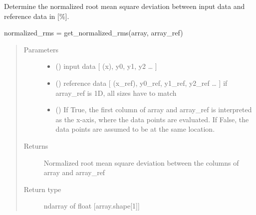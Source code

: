 \documentclass[letterpaper,10pt,english,openany,oneside]{sphinxmanual}
\begin{document}

\begin{fulllineitems}
\label{\detokenize{pygpc:pygpc.misc.get_normalized_rms_deviation}}
Determine the normalized root mean square deviation between input data and reference data in {[}\%{]}.

normalized\_rms = get\_normalized\_rms(array, array\_ref)
\begin{quote}\begin{description}
\item[{Parameters}] \leavevmode\begin{itemize}
\item {} 
 () \textendash{} input data {[} (x), y0, y1, y2 … {]}

\item {} 
 () \textendash{} reference data {[} (x\_ref), y0\_ref, y1\_ref, y2\_ref … {]}
if array\_ref is 1D, all sizes have to match

\item {} 
 (\sphinxstyleliteralemphasis{\sphinxupquote{, }}\sphinxstyleliteralemphasis{\sphinxupquote{, }}) \textendash{} If True, the first column of array and array\_ref is interpreted as the x-axis, where the data points are
evaluated. If False, the data points are assumed to be at the same location.

\end{itemize}

\item[{Returns}] \leavevmode
{} \textendash{} Normalized root mean square deviation between the columns of array and array\_ref

\item[{Return type}] \leavevmode
ndarray of float {[}array.shape{[}1{]}{]}

\end{description}\end{quote}

\end{fulllineitems}
\end{document}
